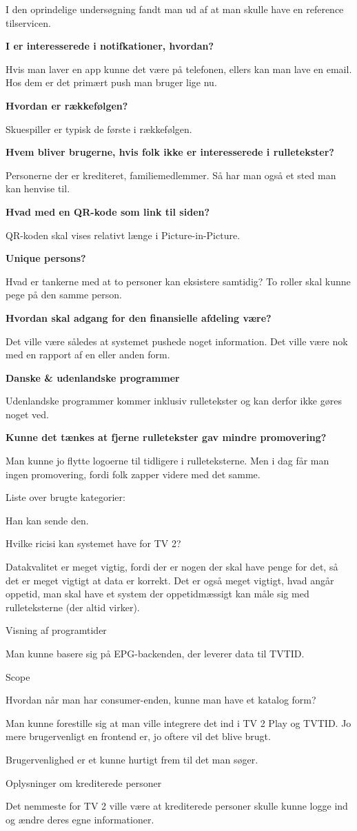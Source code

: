 I den oprindelige undersøgning fandt man ud af at man skulle have en reference tilservicen.

\textbf{I er interesserede i notifkationer, hvordan?}

Hvis man laver en app kunne det være på telefonen, ellers kan man lave en email. Hos dem er det primært push man bruger lige nu.

\textbf{Hvordan er rækkefølgen?}

Skuespiller er typisk de første i rækkefølgen.

\textbf{Hvem bliver brugerne, hvis folk ikke er interesserede i rulletekster?}

Personerne der er krediteret, familiemedlemmer. Så har man også et sted man kan henvise til.

\textbf{Hvad med en QR-kode som link til siden?}

QR-koden skal vises relativt længe i Picture-in-Picture.

\textbf{Unique persons?}

Hvad er tankerne med at to personer kan eksistere samtidig? To roller skal kunne pege på den samme person.

\textbf{Hvordan skal adgang for den finansielle afdeling være?}

Det ville være således at systemet pushede noget information. Det ville være nok med en rapport af en eller anden form.

\textbf{Danske \& udenlandske programmer} 

Udenlandske programmer kommer inklusiv rulletekster og kan derfor ikke gøres noget ved.

\textbf{Kunne det tænkes at fjerne rulletekster gav mindre promovering?}

Man kunne jo flytte logoerne til tidligere i rulleteksterne. Men i dag får man ingen promovering, fordi folk zapper videre med det samme.

Liste over brugte kategorier:

Han kan sende den.

Hvilke ricisi kan systemet have for TV 2?

Datakvalitet er meget vigtig, fordi der er nogen der skal have penge for det, så det er meget vigtigt at data er korrekt. Det er også meget vigtigt, hvad angår oppetid, man skal have et system der oppetidmæssigt kan måle sig med rulleteksterne (der altid virker).

Visning af programtider

Man kunne basere sig på EPG-backenden, der leverer data til TVTID.

Scope

Hvordan når man har consumer-enden, kunne man have et katalog form?

Man kunne forestille sig at man ville integrere det ind i TV 2 Play og TVTID. Jo mere brugervenligt en frontend er, jo oftere vil det blive brugt.

Brugervenlighed er et kunne hurtigt frem til det man søger.

Oplysninger om krediterede personer

Det nemmeste for TV 2 ville være at krediterede personer skulle kunne logge ind og ændre deres egne informationer.
